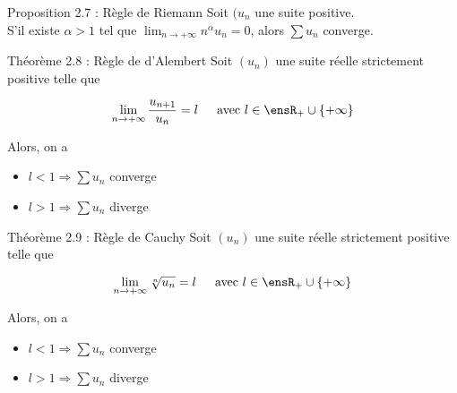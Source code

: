 \begin{theorem}[blue]{Proposition 2.7 : Règle de Riemann}
    Soit $(u_n$ une suite positive. \\
    S'il existe $\alpha > 1$ tel que $\lim_{n \to + \infty} n^\alpha u_n = 0$, alors $\sum u_n$ converge.
\end{theorem}

\clearpage

\begin{theorem}[orange]{Théorème 2.8 : Règle de d'Alembert}
    Soit $(u_n)$ une suite réelle strictement positive telle que

    $$
        \lim_{n \to + \infty} \frac{u_{n + 1}}{u_n} = l \hspace{15px} \text{avec } l \in \ensR_+ \cup \{ + \infty \}
    $$

    \noindent Alors, on a

    \begin{itemize}
        \item $l < 1 \Longrightarrow \sum u_n$ converge
        \item $l > 1 \Longrightarrow \sum u_n$ diverge
    \end{itemize}
\end{theorem}

\begin{theorem}[orange]{Théorème 2.9 : Règle de Cauchy}
    Soit $(u_n)$ une suite réelle strictement positive telle que

    $$
        \lim_{n \to + \infty} \sqrt[n]{u_n} = l \hspace{15px} \text{avec } l \in \ensR_+ \cup \{ + \infty \}
    $$

    \noindent Alors, on a

    \begin{itemize}
        \item $l < 1 \Longrightarrow \sum u_n$ converge
        \item $l > 1 \Longrightarrow \sum u_n$ diverge
    \end{itemize}
\end{theorem}